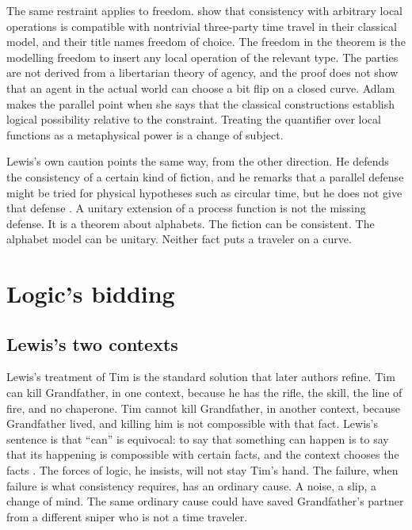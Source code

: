 \documentclass[11pt]{article}
\begin{document}
The same restraint applies to freedom. \citet{baumeler2019} show that consistency with arbitrary local operations is compatible with nontrivial three-party time travel in their classical model, and their title names freedom of choice. The freedom in the theorem is the modelling freedom to insert any local operation of the relevant type. The parties are not derived from a libertarian theory of agency, and the proof does not show that an agent in the actual world can choose a bit flip on a closed curve. Adlam makes the parallel point when she says that the classical constructions establish logical possibility relative to the constraint. Treating the quantifier over local functions as a metaphysical power is a change of subject.

Lewis's own caution points the same way, from the other direction. He defends the consistency of a certain kind of fiction, and he remarks that a parallel defense might be tried for physical hypotheses such as circular time, but he does not give that defense \citep{lewis1976}. A unitary extension of a process function is not the missing defense. It is a theorem about alphabets. The fiction can be consistent. The alphabet model can be unitary. Neither fact puts a traveler on a curve.

\section{Logic's bidding}
\label{sec:logic}

\subsection{Lewis's two contexts}
\label{sec:lewis}

Lewis's treatment of Tim is the standard solution that later authors refine. Tim can kill Grandfather, in one context, because he has the rifle, the skill, the line of fire, and no chaperone. Tim cannot kill Grandfather, in another context, because Grandfather lived, and killing him is not compossible with that fact. Lewis's sentence is that ``can'' is equivocal: to say that something can happen is to say that its happening is compossible with certain facts, and the context chooses the facts \citep{lewis1976}. The forces of logic, he insists, will not stay Tim's hand. The failure, when failure is what consistency requires, has an ordinary cause. A noise, a slip, a change of mind. The same ordinary cause could have saved Grandfather's partner from a different sniper who is not a time traveler.
\end{document}

